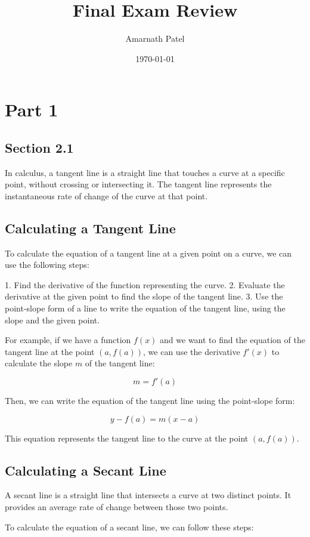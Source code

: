 \documentclass{article}
\begin{document}
\title{Final Exam Review}
\author{Amarnath Patel}
\date{\today}

\maketitle
\section{Part 1}

\subsection{Section 2.1}
In calculus, a tangent line is a straight line that touches a curve at a specific point, without crossing or intersecting it. The tangent line represents the instantaneous rate of change of the curve at that point.

\subsection{Calculating a Tangent Line}
To calculate the equation of a tangent line at a given point on a curve, we can use the following steps:

1. Find the derivative of the function representing the curve.
2. Evaluate the derivative at the given point to find the slope of the tangent line.
3. Use the point-slope form of a line to write the equation of the tangent line, using the slope and the given point.

For example, if we have a function $f(x)$ and we want to find the equation of the tangent line at the point $(a, f(a))$, we can use the derivative $f'(x)$ to calculate the slope $m$ of the tangent line:

\[ m = f'(a) \]

Then, we can write the equation of the tangent line using the point-slope form:

\[ y - f(a) = m(x - a) \]

This equation represents the tangent line to the curve at the point $(a, f(a))$.

\subsection{Calculating a Secant Line}
A secant line is a straight line that intersects a curve at two distinct points. It provides an average rate of change between those two points.

To calculate the equation of a secant line, we can follow these steps:
\end{document}
